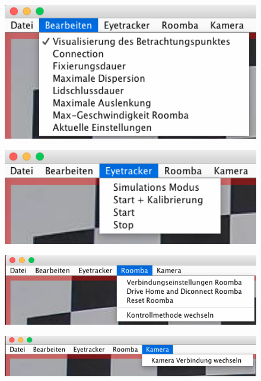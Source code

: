 \begin{figure}[ht]
\begin{center}
   \begin{minipage}[t]{.4\linewidth} 
      \centering 
      \includegraphics[width=1\textwidth]
      {bilder/implementierung/bearbeiten.png} 
      \label{fig:l3} 
   \end{minipage}%
    \begin{minipage}[t]{.4\linewidth} 
      \centering 
      \includegraphics[width=1\textwidth]
      {bilder/implementierung/eyetracker.png} 
      \label{fig:l3} 
   \end{minipage}%
   \hfill
   \begin{minipage}[t]{.4\linewidth} 
      \centering 
      \includegraphics[width=1\textwidth]
      {bilder/implementierung/roomba.png} 
      \label{fig:l2} 
   \end{minipage}%
\begin{minipage}[t]{.4\linewidth} 
      \centering 
      \includegraphics[width=1\textwidth]{bilder/implementierung/kamera.png} 
      \label{fig:l1} 
   \end{minipage}%
   \hfill


\end{center}
\end{figure}
